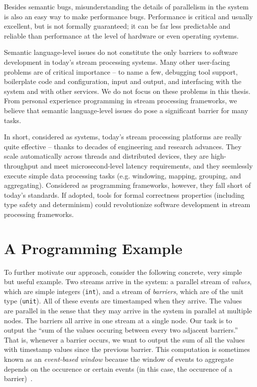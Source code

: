Besides semantic bugs, misunderstanding the details of parallelism in the system is also an easy way to make performance bugs. Performance is critical and usually excellent, but is not formally guaranteed; it can be far less predictable and reliable than performance at the level of hardware or even operating systems.

Semantic language-level issues do not constitute the only barriers to software development in today's stream processing systems. Many other user-facing problems are of critical importance -- to name a few, debugging tool support, boilerplate code and configuration, input and output, and interfacing with the system and with other services. We do not focus on these problems in this thesis. From personal experience programming in stream processing frameworks, we believe that semantic language-level issues do pose a significant barrier for many tasks.

In short, considered as systems, today's stream processing platforms are really quite effective -- thanks to decades of engineering and research advances. They scale automatically across threads and distributed devices, they are high-throughput and meet microsecond-level latency requirements, and they seemlessly execute simple data processing tasks (e.g. windowing, mapping, grouping, and aggregating). Considered as programming frameworks, however, they fall short of today's standards. If adopted, tools for formal correctness properties (including type safety and determinism) could revolutionize software development in stream processing frameworks.

\section{A Programming Example}

To further motivate our approach, consider the following concrete, very simple but useful example.
Two streams arrive in the system: a parallel stream of \emph{values}, which are simple integers (\texttt{int}), and a stream of \emph{barriers}, which are of the unit type (\texttt{unit}).
All of these events are timestamped when they arrive.
The values are parallel in the sense that they may arrive in the system in parallel at multiple nodes.
The barriers all arrive in one stream at a single node.
Our task is to output the ``sum of the values occuring between every two adjacent barriers.'' That is, whenever a barrier occurs, we want to output the sum of all the values with timestamp values since the previous barrier. This computation is sometimes known as an \emph{event-based window} because the window of events to aggregate depends on the occurence or certain events (in this case, the occurence of a barrier)~\cite{EventBasedWindow}.

